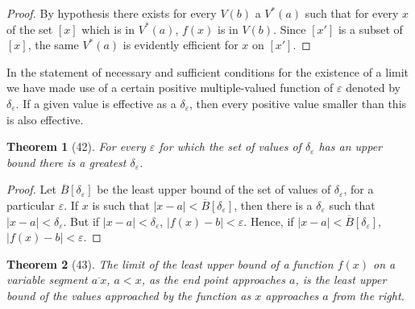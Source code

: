 \documentclass[a4paper,12pt]{book}[2004/02/16]
\providecommand{\hypertarget}[2]{#2}
\theoremstyle{ilemma}
\theoremstyle{itheorem}
\newtheorem{theorem}{Theorem}
\theoremstyle{iother}
\theoremstyle{icorollary}
\theoremstyle{numcorollary}
\theoremstyle{idefinition}
\begin{document}
\begin{proof}
By hypothesis there exists for every $V(b)$ a $V^*(a)$ such that for
every $x$ of the set $[x]$ which is in $V^*(a)$, $f(x)$ is in
$V(b)$. Since $[x']$ is a subset of $[x]$, the same $V^*(a)$ is
evidently efficient for $x$ on $[x']$.
\end{proof}

In the statement of necessary and sufficient conditions for the
existence of a limit we have made use of a certain positive
multiple-valued function of $\varepsilon$ denoted by
$\delta_\varepsilon$. If a given value is effective as a
$\delta_\varepsilon$, then every positive value smaller than this is
also effective.

\begin{theorem}[42]\hypertarget{thm42}{}
For every $\varepsilon$ for which the set of values of
$\delta_\varepsilon$ has an upper bound there is a greatest
$\delta_\varepsilon$.
\end{theorem}

\begin{proof}
Let $\overline{B}[\delta_\varepsilon]$ be the least upper bound of the
set of values of $\delta_\varepsilon$, for a particular
$\varepsilon$. If $x$ is such that $|x-a|<
\overline{B}[\delta_\varepsilon]$, then there is a
$\delta_\varepsilon$ such that $|x-a|< \delta_\varepsilon$. But if
$|x-a|< \delta_\varepsilon$, $|f(x)-b|< \varepsilon$. Hence, if
$|x-a|< \overline{B}[\delta_\varepsilon]$, $|f(x)-b|< \varepsilon$.
\end{proof}

\begin{theorem}[43]\hypertarget{thm43}{}
The limit of the least upper bound of a function $f(x)$ on a variable
segment $\overline{a\ x}$, $a < x$, as the end point approaches $a$,
is the least upper bound of the values approached by the function as
$x$ approaches $a$ from the right.
\end{theorem}
\end{document}

